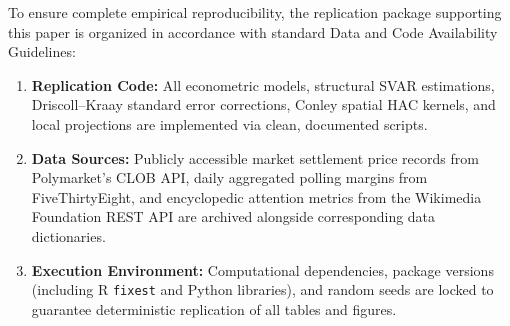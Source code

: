 \documentclass[12pt, a4paper]{article}
\begin{document}
To ensure complete empirical reproducibility, the replication package supporting this paper is organized in accordance with standard Data and Code Availability Guidelines:
\begin{enumerate}
    \item \textbf{Replication Code:} All econometric models, structural SVAR estimations, Driscoll--Kraay standard error corrections, Conley spatial HAC kernels, and local projections are implemented via clean, documented scripts.
    \item \textbf{Data Sources:} Publicly accessible market settlement price records from Polymarket's CLOB API, daily aggregated polling margins from FiveThirtyEight, and encyclopedic attention metrics from the Wikimedia Foundation REST API are archived alongside corresponding data dictionaries.
    \item \textbf{Execution Environment:} Computational dependencies, package versions (including R \texttt{fixest} and Python libraries), and random seeds are locked to guarantee deterministic replication of all tables and figures.
\end{enumerate}
\end{document}
